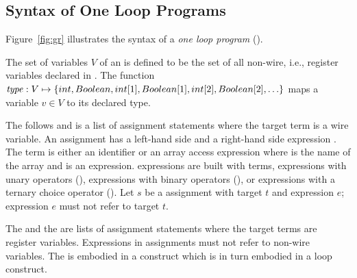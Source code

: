 \subsection{Syntax of One Loop Programs}
%

Figure~\ref{fig:gr} illustrates the syntax of a 
{\em one loop program} (\caig).


\begin{definition}
The set of variables $V$ of an \caig is defined to be 
the set of all non-wire, i.e., register variables declared in .
The function $\mathit{type}: V \mapsto \{ int, Boolean, int[1], Boolean[1], int[2], Boolean[2], \ldots \}$ maps a variable
$v \in V$ to its declared type. 
\end{definition}


The  follows  and is a list 
of assignment statements where the target term is a wire 
variable. 
An assignment has a left-hand side  and 
a right-hand side expression . 
The term is either an identifier  or an array 
access expression  where  is the name
of the array and  is an expression. 
\caig expressions are built with terms, expressions with unary
operators (\cci{-,!}), expressions with binary operators (\cci{+,-,*,/,<,>,<=,>=,==,\&\&,||}), 
or expressions with a ternary choice operator 
(). 
Let $s$ be a  assignment with target $t$ and 
expression $e$; expression $e$ must not refer to target $t$. 



The  and the  are lists 
of assignment statements where the target terms are register variables.
Expressions in  assignments 
must not refer to non-wire
variables. 
The  is embodied in a  construct
which is in turn embodied in a  loop construct. 




